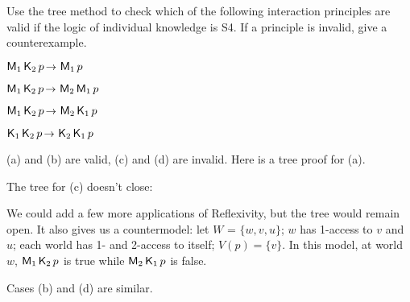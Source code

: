 \begin{exercise}
  Use the tree method to check which of the following interaction principles are
  valid if the logic of individual knowledge is S4. If a principle is invalid,
  give a counterexample.
  \begin{exlist}
  \item $\Mi_1 \Kn_2 p \to \Mi_1 p$ 
  \item $\Mi_1 \Kn_2 p \to \Mi_2\Mi_1 p$
  \item $\Mi_1 \Kn_2 p \to \Mi_2\Kn_1 p$
  \item $\Kn_1\Kn_2 p \to \Kn_2\Kn_1 p$
  \end{exlist}
\end{exercise}
\begin{solution}
  (a) and (b) are valid, (c) and (d) are invalid. Here is a tree proof for (a).
  
  \bigskip
  \begin{center}
  \end{center}

  The tree for (c) doesn't close:
  
  \bigskip
  \begin{center}
  \end{center}
  We could add a few more applications of Reflexivity, but the tree would remain
  open. It also gives us a countermodel: let $W$ = $\{ w,v,u \}$; $w$ has
  1-access to $v$ and $u$; each world has 1- and 2-access to itself;
  $V(p) = \{ v \}$. In this model, at world $w$, $\operatorname{\mathsf{M}}_1\operatorname{\mathsf{K}{}}_2 p$ is
  true while $\operatorname{\mathsf{M}}_2\operatorname{\mathsf{K}{}}_1 p$ is false.

  Cases (b) and (d) are similar.
  
\end{solution}

